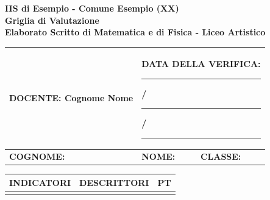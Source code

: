 

\newpage

\thispagestyle{empty}
\vspace*{-5em} 

\renewcommand{\arraystretch}{1.2}
\begin{center}
    \textbf{IIS di Esempio - Comune Esempio (XX)}\\
    \textbf{Griglia di Valutazione
    \\Elaborato Scritto di Matematica e di Fisica - Liceo Artistico}
\end{center}
\begin{tabularx}{\textwidth}{|m{6.8cm}|m{5.6cm}|m{3.5cm}|}
\hline
\textbf{DOCENTE:} Cognome Nome &
\multicolumn{2}{|l|}{\textbf{DATA DELLA VERIFICA:} \rule{1.15cm}{0.4pt}/\rule{1.15cm}{0.4pt}/\rule{1.25cm}{0.4pt}}\\
\hline
\textbf{COGNOME:} &
\textbf{NOME:} &
\textbf{CLASSE:} \\
\hline
\end{tabularx}

\vspace{1mm}

\begin{tabularx}{\textwidth}{|>{\centering}m{3.3cm}|>{\centering\arraybackslash}m{11.8cm}|>{\centering\arraybackslash}m{0.8cm}|}
\hline
\textbf{INDICATORI} & \textbf{DESCRITTORI} & \textbf{PT}\\
\hline
\renewcommand{\arraystretch}{0.5}
&&\\
\end{tabularx}

\vspace{-0.75cm} %

